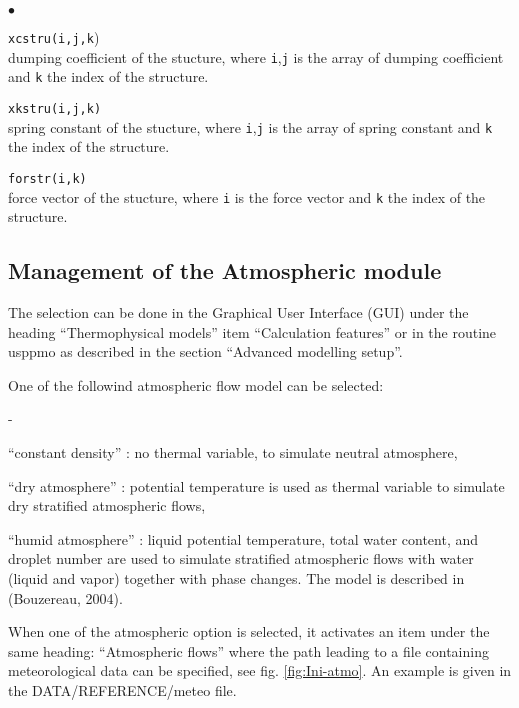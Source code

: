 {\begin{list}{$\bullet$}{}
\item{\texttt{xcstru(i,j,k})}\\
{dumping coefficient of the stucture, where \texttt{i},\texttt{j} is the array of
dumping coefficient and \texttt{k} the index of the structure.}

\item{\texttt{xkstru(i,j,k)}}\\
{spring constant of the stucture, where \texttt{i},\texttt{j} is the array of spring
constant and \texttt{k} the index of the structure.}

\item{\texttt{forstr(i,k)}}\\
{force vector of the stucture, where \texttt{i} is the force vector and
\texttt{k} the index of the structure.}
\end{list}

\subsection{Management of the Atmospheric module}

The selection can be done in the Graphical User Interface (GUI)
 under the heading ``Thermophysical models'' item ``Calculation features''
or in the routine usppmo as described in the section ``Advanced modelling setup''.
 
One of the followind atmospheric flow model can be selected:
\begin{list}{-}{}
 \item ``constant density'' : no thermal variable, to simulate neutral atmosphere,
 \item ``dry atmosphere'' : potential temperature is used as thermal variable to simulate dry stratified
atmospheric flows,
 \item ``humid atmosphere'' : liquid potential temperature, total water content, and droplet number are
used to simulate stratified atmospheric flows with water (liquid and vapor) together with phase changes.
The model is described in (Bouzereau, 2004).
\end{list}

When one of the atmospheric option is selected, it activates an item under the same heading:
``Atmospheric flows'' where the path leading to a file containing meteorological data can be specified, see
 fig. \ref {fig:Ini-atmo}. An example is given in the DATA/REFERENCE/meteo file.

}
